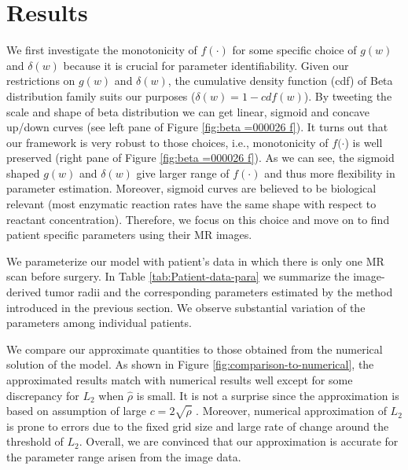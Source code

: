 \documentclass{aims}
\numberwithin{equation}{section}
\begin{document}
\section{Results}
We first investigate the monotonicity of $f(\cdot)$ for some specific
choice of $g(w)$ and $\delta(w)$ because it is crucial for parameter
identifiability. Given our restrictions on $g(w)$ and $\delta(w)$,
the cumulative density function (cdf) of Beta distribution family
suits our purposes ($\delta(w)=1-cdf(w)$). By tweeting the scale
and shape of beta distribution we can get linear, sigmoid and concave
up/down curves (see left pane of Figure \ref{fig:beta =000026 f}).
It turns out that our framework is very robust to those choices, i.e.,
monotonicity of $f(\cdot$) is well preserved (right pane of Figure
\ref{fig:beta =000026 f}). As we can see, the sigmoid shaped $g(w)$
and $\delta(w)$ give larger range of $f(\cdot)$ and thus more flexibility
in parameter estimation. Moreover, sigmoid curves are believed to
be biological relevant (most enzymatic reaction rates have the same
shape with respect to reactant concentration). Therefore, we focus
on this choice and move on to find patient specific parameters using
their MR images. 

We parameterize our model with patient's data in which there is only
one MR scan before surgery. In Table \ref{tab:Patient-data-para}
we summarize the image-derived tumor radii and the corresponding parameters
estimated by the method introduced in the previous section. We observe
substantial variation of the parameters among individual patients. 

We compare our approximate quantities to those obtained from the numerical
solution of the model. As shown in Figure \ref{fig:comparison-to-numerical},
the approximated results match with numerical results well except
for some discrepancy for $L_{2}$ when $\hat{\rho}$ is small. It
is not a surprise since the approximation is based on assumption of
large $c=2\sqrt{\hat{\rho}}$ . Moreover, numerical approximation
of $L_{2}$ is prone to errors due to the fixed grid size and large
rate of change around the threshold of $L_{2}$. Overall, we are convinced
that our approximation is accurate for the parameter range arisen
from the image data. 
\end{document}
